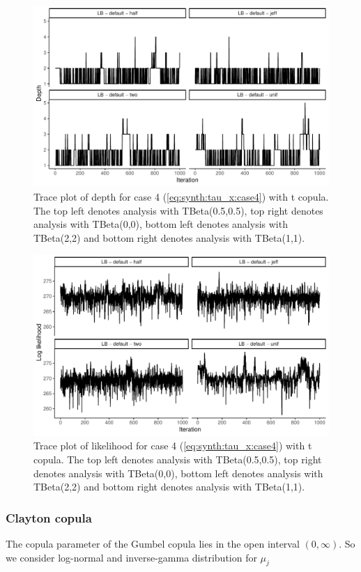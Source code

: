\documentclass{amsart}
\begin{document}
\begin{figure}
	\centering
	\includegraphics[width = 0.75\linewidth]{trace_case4_t_depth.pdf}
	\caption{Trace plot of depth for case 4 (\cref{eq:synth:tau_x:case4}) with t copula. The top left denotes analysis with TBeta(0.5,0.5), top right denotes analysis with TBeta(0,0), bottom left denotes analysis with TBeta(2,2) and bottom right denotes analysis with TBeta(1,1).}
	\label{fig:case4:t:depth}
\end{figure}

\begin{figure}
	\centering
	\includegraphics[width = 0.75\linewidth]{trace_case4_t_like.pdf}
	\caption{Trace plot of likelihood for case 4 (\cref{eq:synth:tau_x:case4}) with t copula. The top left denotes analysis with TBeta(0.5,0.5), top right denotes analysis with TBeta(0,0), bottom left denotes analysis with TBeta(2,2) and bottom right denotes analysis with TBeta(1,1).}
	\label{fig:case4:t:like}
\end{figure}

\subsubsection{Clayton copula} The copula parameter of the Gumbel copula lies in the open interval $(0,\infty)$. So we consider log-normal and inverse-gamma distribution for $\mu_j$
\end{document}
